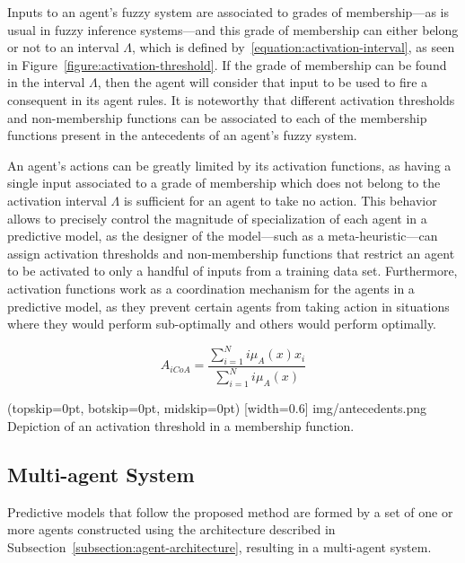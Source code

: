 \documentclass{ieeeaccess}
\begin{document}
Inputs to an agent's fuzzy system are associated to grades of membership---as
is usual in fuzzy inference systems---and this grade of membership can either
belong or not to an interval $\Lambda$, which is defined by~\ref{equation:activation-interval}, as seen in
Figure~\ref{figure:activation-threshold}. If the grade of membership can be
found in the interval $\Lambda$, then the agent will consider that input to be
used to fire a consequent in its agent rules. It is noteworthy that different
activation thresholds and non-membership functions can be associated to each of
the membership functions present in the antecedents of an agent's fuzzy system.

An agent's actions can be greatly limited by its activation functions, as having
a single input associated to a grade of membership which does not belong to the
activation interval $\Lambda$ is sufficient for an agent to take no action. This
behavior allows to precisely control the magnitude of specialization of each agent
in a predictive model, as the designer of the model---such as a
meta-heuristic---can assign activation thresholds and non-membership functions
that restrict an agent to be activated to only a handful of inputs from a
training data set. Furthermore, activation functions work as a coordination
mechanism for the agents in a predictive model, as they prevent certain agents
from taking action in situations where they would perform sub-optimally and
others would perform optimally.

\begin{equation}
  \label{equation:activation-interval}
  A_{iCoA} = \dfrac{\sum_{i=1}^{N} i\mu_{A}(x) x_{i}}{\sum_{i=1}^{N}
    i\mu_{A}(x)}
\end{equation}

\Figure[](topskip=0pt, botskip=0pt, midskip=0pt)
[width=0.6\linewidth]
{img/antecedents.png}
{Depiction of an activation threshold in a membership function.
  \label{figure:activation-threshold}}

\subsection{Multi-agent System}
\label{subsection:mult-agent-system}

Predictive models that follow the proposed method are formed by a set
of one or more agents constructed using the architecture described in
Subsection~\ref{subsection:agent-architecture}, resulting in a multi-agent
system.
\end{document}
